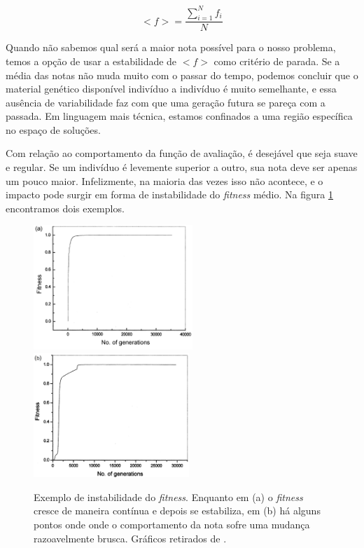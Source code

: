 	\begin{equation}\label{fitness_medio}
		<f> = \frac{\displaystyle\sum_{i = 1}^{N} f_i}{N}
	\end{equation}
	
	
	Quando não sabemos qual será a maior nota possível para o nosso problema, temos a opção de usar a estabilidade de $<f>$ como critério de parada. Se a média das notas não muda muito com o passar do tempo, podemos concluir que o material genético disponível indivíduo a indivíduo é muito semelhante, e essa ausência de variabilidade faz com que uma geração futura se pareça com a passada. Em linguagem mais técnica, estamos confinados a uma região específica no espaço de soluções.
	
	Com relação ao comportamento da função de avaliação, é desejável que seja suave e regular. Se um indivíduo é levemente superior a outro, sua nota deve ser apenas um pouco maior. Infelizmente, na maioria das vezes isso não acontece, e o impacto pode surgir em forma de instabilidade do \textit{fitness} médio. Na figura \ref{figFitness} encontramos dois exemplos.

	\begin{figure}[htp]
		\begin{center}
			\includegraphics[height=4.7cm]{figs/ga/func_aval_estavel.png}
			\includegraphics[height=4.7cm]{figs/ga/func_aval_instavel.png}
		\end{center}
		\caption{\label{figFitness}Exemplo de instabilidade do \textit{fitness}. Enquanto em (a) o \textit{fitness} cresce de maneira contínua e depois se estabiliza, em (b) há alguns pontos onde onde o comportamento da nota sofre uma mudança razoavelmente brusca. Gráficos retirados de \cite{metodo2004}.}
	\end{figure}

